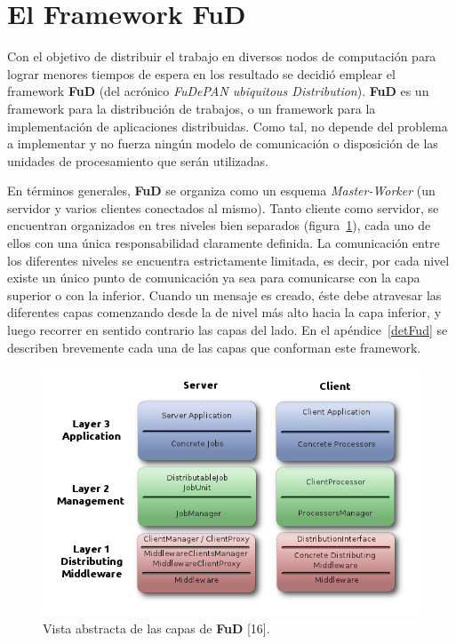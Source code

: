 \section{El Framework FuD}
\par Con el objetivo de distribuir el trabajo en diversos nodos de computación para lograr menores tiempos de espera en los resultado se decidió emplear el framework \textbf{FuD} (del acrónico \emph{FuDePAN ubiquitous Distribution}). \textbf{FuD} es un framework para la distribución de trabajos, o un framework para la implementación de aplicaciones distribuidas\cite{clus09}. Como tal, no depende del problema a implementar y no fuerza ningún modelo de comunicación o disposición de las unidades de procesamiento que serán utilizadas. 
\par En términos generales, \textbf{FuD} se organiza como un esquema \emph{Master-Worker} (un servidor y varios clientes conectados al mismo). Tanto cliente como servidor, se encuentran organizados en tres niveles bien separados (figura~\ref{disenioFud}), cada uno de ellos con una única responsabilidad claramente definida. La comunicación entre los diferentes niveles se encuentra estrictamente limitada, es decir, por cada nivel existe un único punto de comunicación ya sea para comunicarse con la capa superior o con la inferior. Cuando un mensaje es creado, éste debe atravesar las diferentes capas comenzando desde la de nivel más alto hacia la capa inferior, y luego recorrer en sentido contrario las capas del lado. En el apéndice~\ref{detFud} se describen brevemente cada una de las capas que conforman este framework.

\begin{figure}[h!] \hspace{.60cm}
    \includegraphics[scale=.55]{image/AbstractLayers.png}
    \caption{Vista abstracta de las capas de \textbf{FuD} [16].} 
    \label{disenioFud}
\end{figure}

